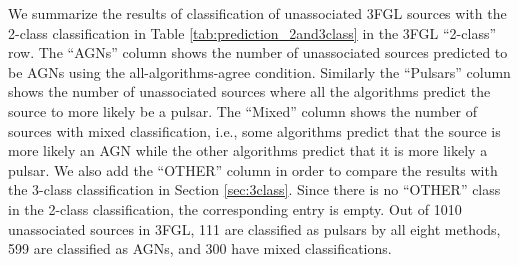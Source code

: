 \documentclass{aa}
\begin{document}
\begin{table}[!h]

    \caption{Expected numbers of sources among the unassociated 3FGL and 4FGL-DR2 sources.}
    \label{tab:prediction_2and3class}

\centering
{}
\end{table}

We summarize the results of classification of unassociated 3FGL sources with the 2-class classification 
in Table \ref{tab:prediction_2and3class} in the 3FGL ``2-class'' row.
The ``AGNs'' column shows the number of unassociated sources predicted to be AGNs using the all-algorithms-agree condition.
Similarly the ``Pulsars'' column shows the number of unassociated sources where all the algorithms predict the source to more likely be a pulsar.
The ``Mixed'' column shows the number of sources with mixed classification, i.e., some algorithms predict that the source is more likely an AGN while the other algorithms predict that it is more likely a pulsar.
We also add the ``OTHER'' column in order to compare the results with the 3-class classification in Section \ref{sec:3class}.
Since there is no ``OTHER'' class in the 2-class classification, the corresponding entry is empty.
Out of 1010 unassociated sources in 3FGL, 111 are classified as pulsars by all eight methods, 599 are classified as AGNs, and 300 have mixed classifications.
\end{document}
